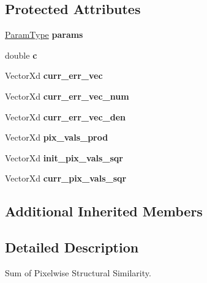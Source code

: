 \subsection*{Protected Attributes}
\begin{DoxyCompactItemize}
\item 
\hypertarget{classSPSS_ab8e62f7429cbf95436410aa8101a8668}{\hyperlink{structSPSSParams}{Param\-Type} {\bfseries params}}\label{classSPSS_ab8e62f7429cbf95436410aa8101a8668}

\item 
\hypertarget{classSPSS_a3848b79d0324a4570b98388cbd92bfd2}{double {\bfseries c}}\label{classSPSS_a3848b79d0324a4570b98388cbd92bfd2}

\item 
\hypertarget{classSPSS_ab0f144fcff3cdd3a6230b75091c8fc60}{Vector\-Xd {\bfseries curr\-\_\-err\-\_\-vec}}\label{classSPSS_ab0f144fcff3cdd3a6230b75091c8fc60}

\item 
\hypertarget{classSPSS_a1c7f32461d4f4e5f048324be8849a071}{Vector\-Xd {\bfseries curr\-\_\-err\-\_\-vec\-\_\-num}}\label{classSPSS_a1c7f32461d4f4e5f048324be8849a071}

\item 
\hypertarget{classSPSS_afe5df759d7086fe0434e21cfa27648fc}{Vector\-Xd {\bfseries curr\-\_\-err\-\_\-vec\-\_\-den}}\label{classSPSS_afe5df759d7086fe0434e21cfa27648fc}

\item 
\hypertarget{classSPSS_ae2d118799c8f289638db77a354e79c01}{Vector\-Xd {\bfseries pix\-\_\-vals\-\_\-prod}}\label{classSPSS_ae2d118799c8f289638db77a354e79c01}

\item 
\hypertarget{classSPSS_ac41565c849198977db5098fded8766ed}{Vector\-Xd {\bfseries init\-\_\-pix\-\_\-vals\-\_\-sqr}}\label{classSPSS_ac41565c849198977db5098fded8766ed}

\item 
\hypertarget{classSPSS_ad85d65bc815918019127deef450dc88c}{Vector\-Xd {\bfseries curr\-\_\-pix\-\_\-vals\-\_\-sqr}}\label{classSPSS_ad85d65bc815918019127deef450dc88c}

\end{DoxyCompactItemize}
\subsection*{Additional Inherited Members}


\subsection{Detailed Description}
Sum of Pixelwise Structural Similarity. 

